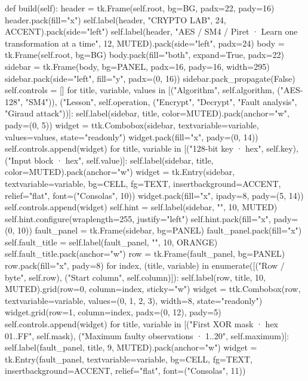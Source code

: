 \begin{lightcode}[numbers=left,firstnumber=1]
    def build(self):
        header = tk.Frame(self.root, bg=BG, padx=22, pady=16)
        header.pack(fill="x")
        self.label(header, "CRYPTO LAB", 24, ACCENT).pack(side="left")
        self.label(header, "AES / SM4 / Piret · Learn one transformation at a time", 12, MUTED).pack(side="left", padx=24)
        body = tk.Frame(self.root, bg=BG)
        body.pack(fill="both", expand=True, padx=22)
        sidebar = tk.Frame(body, bg=PANEL, padx=16, pady=16, width=295)
        sidebar.pack(side="left", fill="y", padx=(0, 16))
        sidebar.pack_propagate(False)
        self.controls = []
        for title, variable, values in [("Algorithm", self.algorithm, ("AES-128", "SM4")), ("Lesson", self.operation, ("Encrypt", "Decrypt", "Fault analysis", "Giraud attack"))]:
            self.label(sidebar, title, color=MUTED).pack(anchor="w", pady=(0, 5))
            widget = ttk.Combobox(sidebar, textvariable=variable, values=values, state="readonly")
            widget.pack(fill="x", pady=(0, 14))
            self.controls.append(widget)
        for title, variable in [("128-bit key · hex", self.key), ("Input block · hex", self.value)]:
            self.label(sidebar, title, color=MUTED).pack(anchor="w")
            widget = tk.Entry(sidebar, textvariable=variable, bg=CELL, fg=TEXT, insertbackground=ACCENT, relief="flat", font=("Consolas", 10))
            widget.pack(fill="x", ipady=8, pady=(5, 14))
            self.controls.append(widget)
        self.hint = self.label(sidebar, "", 10, MUTED)
        self.hint.configure(wraplength=255, justify="left")
        self.hint.pack(fill="x", pady=(0, 10))
        fault_panel = tk.Frame(sidebar, bg=PANEL)
        fault_panel.pack(fill="x")
        self.fault_title = self.label(fault_panel, "", 10, ORANGE)
        self.fault_title.pack(anchor="w")
        row = tk.Frame(fault_panel, bg=PANEL)
        row.pack(fill="x", pady=8)
        for index, (title, variable) in enumerate([("Row / byte", self.row), ("Start column", self.column)]):
            self.label(row, title, 10, MUTED).grid(row=0, column=index, sticky="w")
            widget = ttk.Combobox(row, textvariable=variable, values=(0, 1, 2, 3), width=8, state="readonly")
            widget.grid(row=1, column=index, padx=(0, 12), pady=5)
            self.controls.append(widget)
        for title, variable in [("First XOR mask · hex 01..FF", self.mask), ("Maximum faulty observations · 1..20", self.maximum)]:
            self.label(fault_panel, title, 9, MUTED).pack(anchor="w")
            widget = tk.Entry(fault_panel, textvariable=variable, bg=CELL, fg=TEXT, insertbackground=ACCENT, relief="flat", font=("Consolas", 11))

\end{lightcode}
